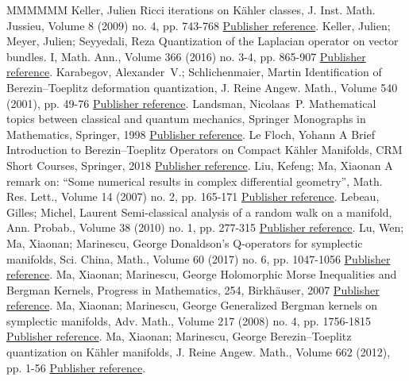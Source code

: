 \documentclass[11pt]{article}
\theoremstyle{definition}
\numberwithin{equation}{section}
\numberwithin{figure}{section}
\numberwithin{table}{section}
\newcommand\< {\mathcal{h}}
\renewcommand\> {\mathcal{i}}
\begin{document}
\begin{thebibliography}{MMMMMM}
 Keller, Julien Ricci iterations on Kähler classes, J. Inst. Math. Jussieu, Volume 8 (2009) no. 4, pp. 743-768 \href{https://ahl.centre-mersenne.org/item/AHL_2020__3__1343_0/#Keller09}{Publisher reference}.
 Keller, Julien; Meyer, Julien; Seyyedali, Reza Quantization of the Laplacian operator on vector bundles. I, Math. Ann., Volume 366 (2016) no. 3-4, pp. 865-907 \href{https://ahl.centre-mersenne.org/item/AHL_2020__3__1343_0/#Keller16}{Publisher reference}.
 Karabegov, Alexander V.; Schlichenmaier, Martin Identification of Berezin–Toeplitz deformation quantization, J. Reine Angew. Math., Volume 540 (2001), pp. 49-76 \href{https://ahl.centre-mersenne.org/item/AHL_2020__3__1343_0/#KS01}{Publisher reference}.
 Landsman, Nicolaas P. Mathematical topics between classical and quantum mechanics, Springer Monographs in Mathematics, Springer, 1998 \href{https://ahl.centre-mersenne.org/item/AHL_2020__3__1343_0/#La}{Publisher reference}.
 Le Floch, Yohann A Brief Introduction to Berezin–Toeplitz Operators on Compact Kähler Manifolds, CRM Short Courses, Springer, 2018 \href{https://ahl.centre-mersenne.org/item/AHL_2020__3__1343_0/#LF}{Publisher reference}.
 Liu, Kefeng; Ma, Xiaonan A remark on: “Some numerical results in complex differential geometry”, Math. Res. Lett., Volume 14 (2007) no. 2, pp. 165-171 \href{https://ahl.centre-mersenne.org/item/AHL_2020__3__1343_0/#LM07}{Publisher reference}.
 Lebeau, Gilles; Michel, Laurent Semi-classical analysis of a random walk on a manifold, Ann. Probab., Volume 38 (2010) no. 1, pp. 277-315 \href{https://ahl.centre-mersenne.org/item/AHL_2020__3__1343_0/#LM}{Publisher reference}.
 Lu, Wen; Ma, Xiaonan; Marinescu, George Donaldson’s Q-operators for symplectic manifolds, Sci. China, Math., Volume 60 (2017) no. 6, pp. 1047-1056 \href{https://ahl.centre-mersenne.org/item/AHL_2020__3__1343_0/#LMM16}{Publisher reference}.
 Ma, Xiaonan; Marinescu, George Holomorphic Morse Inequalities and Bergman Kernels, Progress in Mathematics, 254, Birkhäuser, 2007 \href{https://ahl.centre-mersenne.org/item/AHL_2020__3__1343_0/#MM07}{Publisher reference}.
 Ma, Xiaonan; Marinescu, George Generalized Bergman kernels on symplectic manifolds, Adv. Math., Volume 217 (2008) no. 4, pp. 1756-1815 \href{https://ahl.centre-mersenne.org/item/AHL_2020__3__1343_0/#MM08}{Publisher reference}.
 Ma, Xiaonan; Marinescu, George Berezin–Toeplitz quantization on Kähler manifolds, J. Reine Angew. Math., Volume 662 (2012), pp. 1-56 \href{https://ahl.centre-mersenne.org/item/AHL_2020__3__1343_0/#MM12}{Publisher reference}.

\end{thebibliography}
\end{document}
